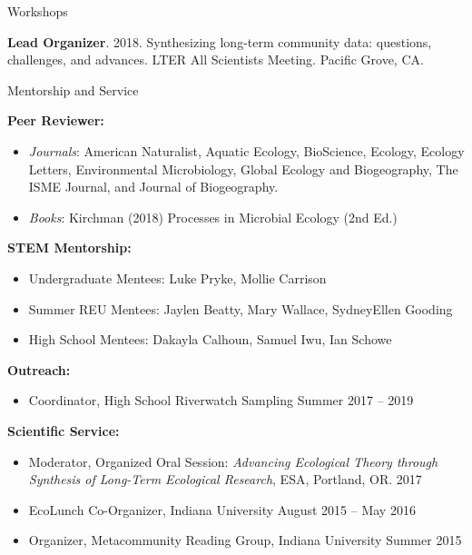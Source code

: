 \documentclass{resume} %
\begin{document}
\bigskip


\begin{rSection}{Workshops}

{\bf Lead Organizer}. 2018. Synthesizing long-term community data: questions, challenges, and advances. LTER All Scientists Meeting. Pacific Grove, CA.

\end{rSection}
\bigskip

\begin{rSection}{Mentorship and Service}

{\bf Peer Reviewer:}
\begin{itemize}
  \item {\em Journals}: American Naturalist, Aquatic Ecology, BioScience, Ecology, Ecology Letters, Environmental Microbiology, Global Ecology and Biogeography, The ISME Journal, and Journal of Biogeography.
  \item {\em Books}: Kirchman (2018) Processes in Microbial Ecology (2nd Ed.)
\end{itemize}

{\bf STEM Mentorship:}
\begin{itemize}
  \item Undergraduate Mentees: Luke Pryke, Mollie Carrison
  \item Summer REU Mentees: Jaylen Beatty, Mary Wallace, SydneyEllen Gooding
  \item High School Mentees: Dakayla Calhoun, Samuel Iwu, Ian Schowe
\end{itemize}

{\bf Outreach:}
\begin{itemize}
  \item {Coordinator, High School Riverwatch Sampling} \hfill Summer 2017 -- 2019
\end{itemize}

{\bf Scientific Service:}
\begin{itemize}
  \item Moderator, Organized Oral Session: {\em Advancing Ecological Theory through Synthesis of Long-Term Ecological Research}, ESA, Portland, OR. \hfill 2017
  \item EcoLunch Co-Organizer, Indiana University \hfill August 2015 -- May 2016
  \item Organizer, Metacommunity Reading Group, Indiana University \hfill Summer 2015
\end{itemize}



\end{rSection}
\end{document}
